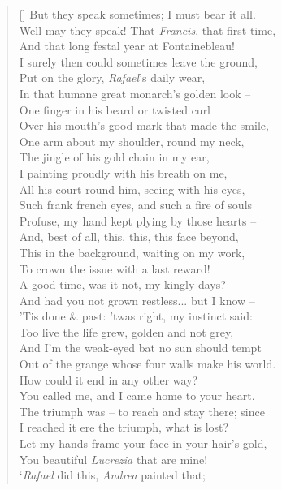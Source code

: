 \documentclass[MAIN]{subfiles}
\begin{document}
\begin{verse}[\versewidth]
But they speak sometimes; I must bear it all.\\ 
Well may they speak! That \emph{Francis}, that first time,\\ 
And that long festal year at {\sc Fontainebleau}!\\
I surely then could sometimes leave the ground,\\
Put on the glory, \emph{Rafael}'s daily wear,\\
In that humane great monarch's golden look --\\
One finger in his beard or twisted curl\\
Over his mouth's good mark that made the smile,\\
One arm about my shoulder, round my neck,\\
The jingle of his gold chain in my ear,\\
I painting proudly with his breath on me,\\
All his court round him, seeing with his eyes,\\
Such frank french eyes, and such a fire of souls\\ 
Profuse, my hand kept plying by those hearts --\\
And, best of all, this, this, this face beyond,\\
This in the background, waiting on my work,\\
To crown the issue with a last reward!\\
A good time, was it not, my kingly days?\\
And had you not grown restless... but I know --\\
'Tis done \& past: 'twas right, my instinct said:\\
Too live the life grew, golden and not grey,\\
And I'm the weak-eyed bat no sun should tempt\\
Out of the grange whose four walls make his world.\\
How could it end in any other way?\\
You called me, and I came home to your heart.\\
The triumph was -- to reach and stay there; since\\
I reached it ere the triumph, what is lost?\\
Let my hands frame your face in your hair's gold,\\
You beautiful \emph{Lucrezia} that are mine!\\ 
`\emph{Rafael} did this, \emph{Andrea} painted that;\\

\end{verse}
\end{document}
